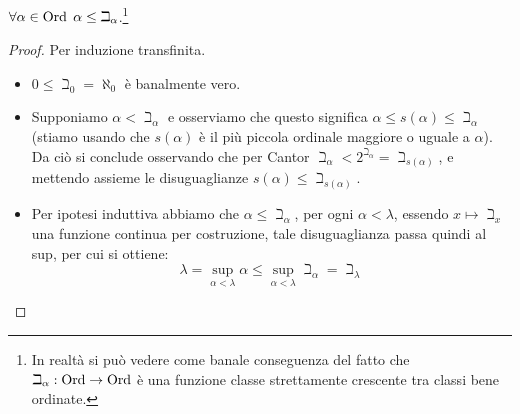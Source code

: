 \begin{lemma}[$\alpha \leq \beth_\alpha$]
	$\forall \alpha \in \operatorname{Ord} \; \alpha \leq \beth_\alpha$.\footnote{In realt\`a si pu\`o vedere come banale conseguenza del fatto che $\beth_\alpha : \operatorname{Ord} \to \operatorname{Ord}$ \`e una funzione classe strettamente crescente tra classi bene ordinate.}
\end{lemma}

\begin{proof}
	Per induzione transfinita.
	\begin{itemize}
		\item[$\boxed{\text{caso 0}}$] $0 \leq \beth_0 = \aleph_0$ \`e banalmente vero.
		\item[$\boxed{\text{caso $s(\alpha)$}}$] Supponiamo $\alpha < \beth_\alpha$ e osserviamo che questo significa $\alpha \leq s(\alpha) \leq \beth_\alpha$ (stiamo usando che $s(\alpha)$ \`e il pi\`u piccola ordinale maggiore o uguale a $\alpha$). Da ci\`o
		si conclude osservando che per Cantor $\beth_\alpha < 2^{\beth_\alpha} = \beth_{s(\alpha)}$, e mettendo assieme le disuguaglianze $s(\alpha) \leq \beth_{s(\alpha)}$.
		\item[$\boxed{\text{caso limite}}$] Per ipotesi induttiva abbiamo che $\alpha \leq \beth_\alpha$, per ogni $\alpha < \lambda$, essendo $x \mapsto \beth_x$ una funzione continua per costruzione, tale disuguaglianza passa quindi al sup, per cui si ottiene:
		\[ \lambda = \sup_{\alpha < \lambda} \alpha \leq \sup_{\alpha < \lambda} \beth_\alpha = \beth_\lambda
			\]
	\end{itemize}
\end{proof}

